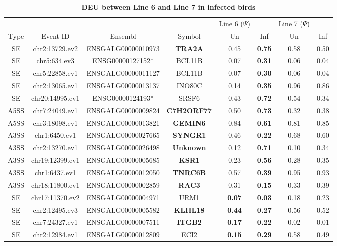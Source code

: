 \documentclass[10pt]{article}
\begin{document}
\begin{table}[!ht]
\caption{
\bf{DEU between Line 6 and Line 7 in infected birds}}
\begin{tabular}{cccccccc}
\hline
& & & & Line 6 ($\Psi$) & & Line 7 ($\Psi$) & \\
Type & Event ID & Ensembl & Symbol  & Un & Inf & Un & Inf \\
\hline
SE & chr2:13729.ev2 & ENSGALG00000010973 & \textbf{TRA2A} & 0.45 & \textbf{0.75} & 0.58 & 0.50 \\
SE & chr5:634.ev3 & ENSG00000127152* & BCL11B & 0.07 & \textbf{0.31} & 0.06 & 0.04 \\
SE & chr5:22858.ev1 & ENSGALG00000011127 & BCL11B & 0.07 & \textbf{0.30} & 0.06 & 0.04 \\
SE & chr2:13065.ev1 & ENSGALG00000013137 & INO80C & 0.14 & \textbf{0.35} & 0.96 & 0.86 \\
SE & chr20:14995.ev1 & ENSG00000124193* & SRSF6 & 0.43 & \textbf{0.72} & 0.54 & 0.34 \\
A5SS & chr7:24049.ev1 & ENSGALG00000009824 & \textbf{C7H2ORF77} & 0.50 & \textbf{0.73} & 0.32 & 0.38 \\
A5SS & chr3:18098.ev1 & ENSGALG00000013821 & \textbf{GEMIN6} & 0.84 & \textbf{0.61} & 0.81 & 0.85 \\
A3SS & chr1:6450.ev1 & ENSGALG00000027665 & \textbf{SYNGR1} & 0.46 & \textbf{0.22} & 0.68 & 0.60 \\
A3SS & chr2:13270.ev1 & ENSGALG00000026498 & \textbf{Unknown} & 0.12 & \textbf{0.71} & 0.10 & 0.34 \\
A3SS & chr19:12399.ev1 & ENSGALG00000005685 & \textbf{KSR1} & 0.23 & \textbf{0.56} & 0.28 & 0.35 \\
A3SS & chr1:6437.ev1 & ENSGALG00000012050 & \textbf{TNRC6B} & 0.57 & \textbf{0.39} & 0.95 & 0.93 \\
A3SS & chr18:11800.ev1 & ENSGALG00000002859 & \textbf{RAC3} & 0.31 & \textbf{0.15} & 0.33 & 0.39 \\
\hline
SE & chr17:11370.ev2 & ENSGALG00000004971 & URM1 & \textbf{0.07} & \textbf{0.03} & 0.18 & 0.23 \\
SE & chr2:12495.ev3 & ENSGALG00000005582 & \textbf{KLHL18} & \textbf{0.44} & \textbf{0.27} & 0.56 & 0.52 \\
SE & chr7:24327.ev1 & ENSGALG00000007511 & \textbf{ITGB2} & \textbf{0.17} & \textbf{0.22} & 0.02 & 0.01 \\
SE & chr2:12984.ev1 & ENSGALG00000012809 & ECI2 & \textbf{0.15} & \textbf{0.29} & 0.58 & 0.49 \\

\end{tabular}
\end{table}
\end{document}
